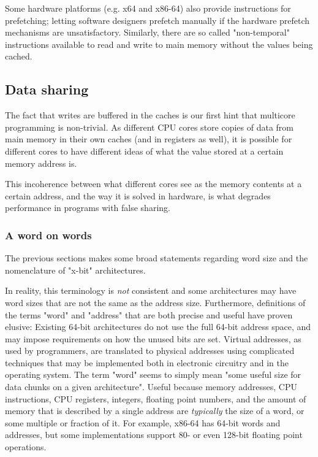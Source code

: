 Some hardware platforms (e.g. x64 and x86-64) also provide instructions for
prefetching; letting software designers prefetch manually if the hardware
prefetch mechanisms are unsatisfactory\cite{whatprogrammersshouldknow}.
Similarly, there are so called "non-temporal" instructions available to read and
write to main memory without the values being cached.

\subsection{Data sharing}
The fact that writes are buffered in the caches is our first hint that
multicore programming is non-trivial. As different CPU cores store copies
of data from main memory in their own caches (and in registers as well), it is
possible for different cores to have different ideas of what the value stored at
a certain memory address is.


This incoherence between what different cores see as the memory contents at a
certain address, and the way it is solved in hardware, is what degrades
performance in programs with false sharing.


\subsubsection{A word on words}
The previous sections makes some broad statements regarding word size and the
nomenclature of "x-bit" architectures.

In reality, this terminology is \textit{not} consistent and some architectures may
have word sizes that are not the same as the address size. Furthermore,
definitions of the terms "word" and "address" that are both precise and useful
have proven elusive: Existing 64-bit architectures do not use the full 64-bit
address space, and may impose requirements on how the unused bits are set.
Virtual addresses, as used by programmers, are translated to physical addresses
using complicated techniques that may be implemented both in electronic
circuitry and in the operating system. The term "word" seems to simply mean
"some useful size for data chunks on a given architecture". Useful because
memory addresses, CPU instructions, CPU registers, integers, floating point
numbers, and the amount of memory that is described by a single address are
\textit{typically} the size of a word, or some multiple or fraction of it. For
example, x86-64 has 64-bit words and addresses, but some implementations support
80- or even 128-bit floating point operations.

